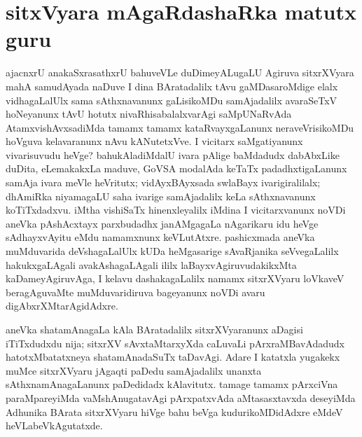 \makeatletter
\def\@makechapterhead#1{%
  \vspace*{10\p@}%
{\fontsize{13pt}{13pt}\selectfont\raggedright{\bf suceVta kaqpalAni}\par}
\vspace*{25\p@}%
  {\parindent \z@ \centering \normalfont
    \ifnum \c@secnumdepth >\m@ne
      \if@mainmatter
        {\LARGE\bfseries  #1}\par\nobreak
	\vskip 4pt
      \fi
    \fi
\smallskip 

 \vskip 10\p@  
{\fontsize{12pt}{12pt}\selectfont\raggedleft{anu: \bf pu.ti.na.}\par}
  }
\vskip 40\p@}
\makeatother

\chapter{sitxVyara mAgaRdashaRka matutx guru}


ajacnxrU anakaSxrasathxrU bahuveVLe duDimeyALugaLU Agiruva sitxrXVyara mahA samudAyada naDuve I dina BAratadalilx tAvu gaMDasaroMdige elalx vidhagaLalUlx sama sAthxnavanunx gaLisikoMDu samAjadalilx  avaraSeTxV hoNeyanunx tAvU hotutx nivaRhisabalalxvarAgi saMpUNaRvAda AtamxvishAvxsadiMda tamamx tamamx kataRvayxgaLanunx neraveVrisikoMDu hoVguva kelavaranunx nAvu kANutetxVve. I vicitarx saMgatiyanunx vivarisuvudu heVge? bahukAladiMdalU ivara pAlige baMdadudx dabAbxLike duDita, eLemakakxLa maduve, GoVSA modalAda keTaTx padadhxtigaLanunx samAja ivara meVle heVritutx; vidAyxBAyxsada swlaBayx ivarigiralilalx; dhAmiRka niyamagaLU saha ivarige samAjadalilx keLa sAthxnavanunx koTiTxdadxvu. iMtha vishiSaTx hinenxleyalilx iMdina I vicitarxvanunx noVDi aneVka pAshAcxtayx parxbudadhx janAMgagaLa nAgarikaru idu heVge sAdhayxvAyitu eMdu namamxnunx keVLutAtxre. pashicxmada aneVka muMduvarida deVshagaLalUlx kUDa heMgasarige sAvaRjanika seVvegaLalilx hakukxgaLAgali avakAshagaLAgali ililx laBayxvAgiruvudakikxMta kaDameyAgiruvAga, I kelavu dashakagaLalilx namamx sitxrXVyaru loVkaveV beragAguvaMte muMduvaridiruva bageyanunx noVDi avaru digAbxrXMtarAgidAdxre.

aneVka shatamAnagaLa kAla BAratadalilx sitxrXVyaranunx aDagisi iTiTxdudxdu nija; sitxrXV sAvxtaMtarxyXda caLuvaLi pArxraMBavAdadudx hatotxMbatatxneya shatamAnadaSuTx taDavAgi. Adare I katatxla yugakekx muMce sitxrXVyaru jAgaqti paDedu samAjadalilx unanxta sAthxnamAnagaLanunx paDedidadx kAlavitutx. tamage tamamx pArxciVna paraMpareyiMda vaMshAnugatavAgi pArxpatxvAda aMtasasxtavxda deseyiMda Adhunika BArata sitxrXVyaru hiVge bahu beVga kudurikoMDidAdxre eMdeV heVLabeVkAgutatxde.

